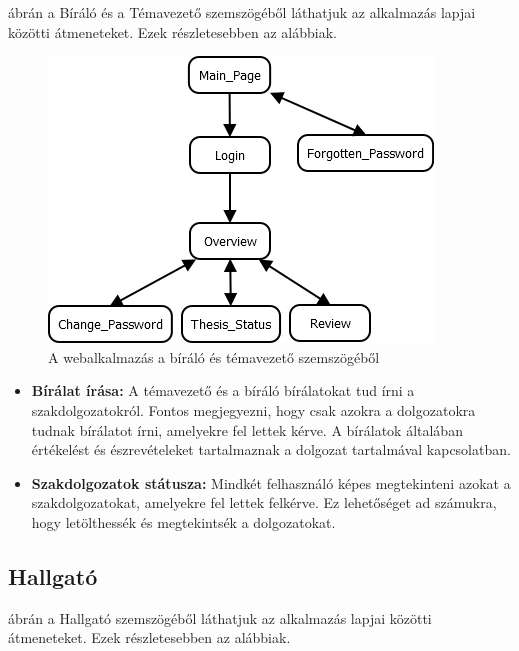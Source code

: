  ábrán a Bíráló és a Témavezető szemszögéből láthatjuk az alkalmazás lapjai közötti átmeneteket. Ezek részletesebben az alábbiak.

\begin{figure}[h]
\centering
\includegraphics[scale=0.5]{images/Biralo.png}
\caption{A webalkalmazás a bíráló és témavezető szemszögéből}
\label{fig:biralo_temavezeto}
\end{figure}

\begin{itemize}

\item \textbf{Bírálat írása:} A témavezető és a bíráló bírálatokat tud írni a szakdolgozatokról. Fontos megjegyezni, hogy csak azokra a dolgozatokra tudnak bírálatot írni, amelyekre fel lettek kérve. A bírálatok általában értékelést és észrevételeket tartalmaznak a dolgozat tartalmával kapcsolatban.

\item \textbf{Szakdolgozatok státusza:} Mindkét felhasználó képes megtekinteni azokat a szakdolgozatokat, amelyekre fel lettek felkérve. Ez lehetőséget ad számukra, hogy letölthessék és megtekintsék a dolgozatokat.

\end{itemize}

\subsection{Hallgató}

 ábrán a Hallgató szemszögéből láthatjuk az alkalmazás lapjai közötti átmeneteket. Ezek részletesebben az alábbiak.

